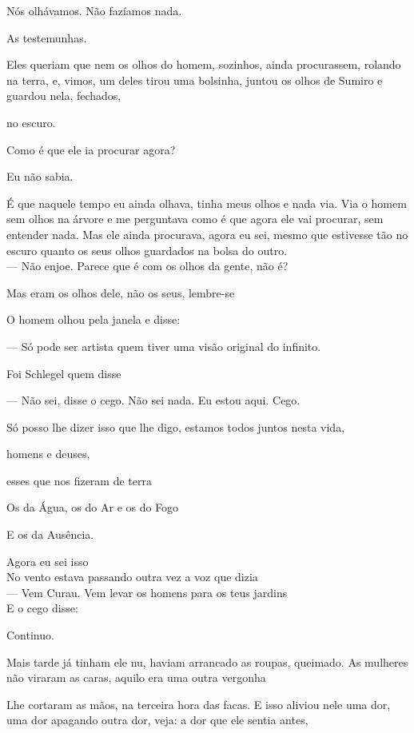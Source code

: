 Nós olhávamos. Não fazíamos nada.

As testemunhas.

Eles queriam que nem os olhos do homem, sozinhos, ainda procurassem,
rolando na terra, e, vimos, um deles tirou uma bolsinha, juntou os olhos
de Sumiro e guardou nela, fechados,

no escuro.

Como é que ele ia procurar agora?

Eu não sabia.

É que naquele tempo eu ainda olhava, tinha meus olhos e nada via. Via o
homem sem olhos na árvore e me perguntava como é que agora ele vai
procurar, sem entender nada. Mas ele ainda procurava, agora eu sei,
mesmo que estivesse tão no escuro quanto os seus olhos guardados na
bolsa do outro.\\

--- Não enjoe. Parece que é com os olhos da gente, não é?

Mas eram os olhos dele, não os seus, lembre-se

O homem olhou pela janela e disse:

--- Só pode ser artista quem tiver uma visão original do infinito.

Foi Schlegel quem disse

--- Não sei, disse o cego. Não sei nada. Eu estou aqui. Cego.

Só posso lhe dizer isso que lhe digo, estamos todos juntos nesta vida,

homens e deuses,

esses que nos fizeram de terra

Os da Água, os do Ar e os do Fogo

E os da Ausência.

Agora eu sei isso\\

No vento estava passando outra vez a voz que dizia\\

--- Vem Curau. Vem levar os homens para os teus jardins\\

E o cego disse:

Continuo.

Mais tarde já tinham ele nu, haviam arrancado as roupas, queimado. As
mulheres não viraram as caras, aquilo era uma outra vergonha

Lhe cortaram as mãos, na terceira hora das facas. E isso aliviou nele
uma dor, uma dor apagando outra dor, veja: a dor que ele sentia antes,

